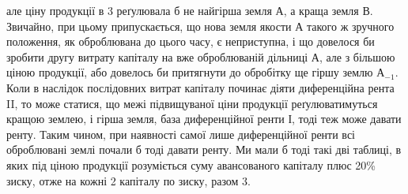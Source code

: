 \parcont{}  %
але ціну продукції в 3 реґулювала б не найгірша земля $А$, а краща
земля $В$. Звичайно, при цьому припускається, що нова земля якости $А$ такого
ж зручного положення, як оброблювана до цього часу, є неприступна, і що довелося
би зробити другу витрату капіталу на вже оброблюваній дільниці $А$, але
з більшою ціною продукції, або довелось би притягнути до обробітку ще гіршу
землю $А_{-1}$. Коли в наслідок послідовних витрат капіталу починає діяти диференційна
рента II, то може статися, що межі підвищуваної ціни продукції реґулюватимуться
кращою землею, і гірша земля, база диференційної ренти І, тоді
теж може давати ренту. Таким чином, при наявності самої лише диференційної
ренти всі оброблювані землі почали б тоді давати ренту. Ми мали б тоді такі
дві таблиці, в яких під ціною продукції розуміється суму авансованого капіталу
плюс 20\%  зиску, отже на кожні 2 капіталу по 
зиску, разом 3.

